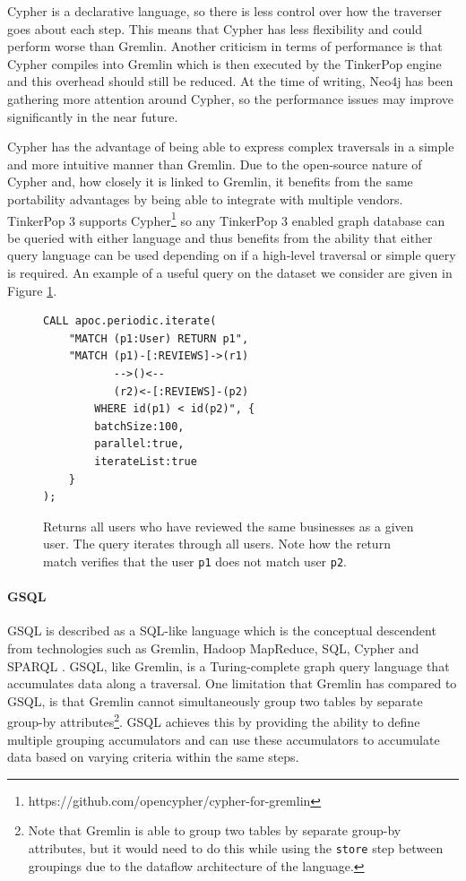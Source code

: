 Cypher is a declarative language, so there is less control over how the traverser goes about each step. This means that Cypher has less flexibility and could perform worse than Gremlin. Another criticism in terms of performance is that Cypher compiles into Gremlin which is then executed by the TinkerPop engine \cite{backToTheFuture} and this overhead should still be reduced. At the time of writing, Neo4j has been gathering more attention around Cypher, so the performance issues may improve significantly in the near future.

Cypher has the advantage of being able to express complex traversals in a simple and more intuitive manner than Gremlin. Due to the open-source nature of Cypher and, how closely it is linked to Gremlin, it benefits from the same portability advantages by being able to integrate with multiple vendors. TinkerPop 3 supports Cypher\footnote{https://github.com/opencypher/cypher-for-gremlin} so any TinkerPop 3 enabled graph database can be queried with either language and thus benefits from the ability that either query language can be used depending on if a high-level traversal or simple query is required. An example of a useful query on the dataset we consider are given in Figure \ref{lst:cypherExample1}.

\begin{figure}[h]
    \centering
    \begin{lstlisting}[language=cypher]
CALL apoc.periodic.iterate(
    "MATCH (p1:User) RETURN p1",
    "MATCH (p1)-[:REVIEWS]->(r1)
           -->()<--
           (r2)<-[:REVIEWS]-(p2)
        WHERE id(p1) < id(p2)", {
        batchSize:100,
        parallel:true,
        iterateList:true
    }
);
    \end{lstlisting}
    \caption{Returns all users who have reviewed the same businesses as a given user. The query iterates through all users. Note how the return match verifies that the user \texttt{p1} does not match user \texttt{p2}.}
    \label{lst:cypherExample1}
\end{figure}

\paragraph{GSQL}

GSQL is described as a SQL-like language which is the conceptual descendent from technologies such as Gremlin, Hadoop MapReduce, SQL, Cypher and SPARQL \cite{gsqlTigergraph}. GSQL, like Gremlin, is a Turing-complete graph query language that accumulates data along a traversal. One limitation that Gremlin has compared to GSQL, is that Gremlin cannot simultaneously group two tables by separate group-by attributes\footnote{Note that Gremlin is able to group two tables by separate group-by attributes, but it would need to do this while using the \texttt{store} step between groupings due to the dataflow architecture of the language.}. GSQL achieves this by providing the ability to define multiple grouping accumulators and can use these accumulators to accumulate data based on varying criteria within the same steps.

